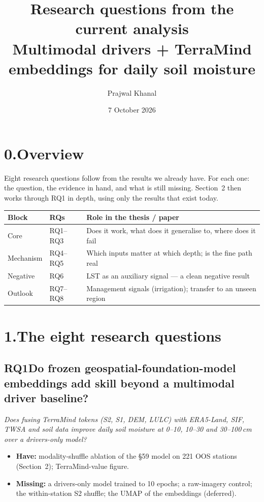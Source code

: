\documentclass[11pt,a4paper]{article}
\title{\textbf{Research questions from the current analysis}\\[3pt]
\large Multimodal drivers + TerraMind embeddings for daily soil moisture}
\author{Prajwal Khanal}
\date{7 October 2026}
\newcommand{\rqhead}[2]{\subsection*{#1\quad #2}}
\begin{document}
\maketitle

\section*{0.\quad Overview}

Eight research questions follow from the results we already have. For each one: the question,
the evidence in hand, and what is still missing. Section~2 then works through RQ1 in depth,
using only the results that exist today.

\begin{center}
\small
\begin{tabularx}{\linewidth}{@{}l l X@{}}
\toprule
Block & RQs & Role in the thesis / paper \\
\midrule
Core        & RQ1--RQ3 & Does it work, what does it generalise to, where does it fail \\
Mechanism   & RQ4--RQ5 & Which inputs matter at which depth; is the fine path real \\
Negative    & RQ6      & LST as an auxiliary signal --- a clean negative result \\
Outlook     & RQ7--RQ8 & Management signals (irrigation); transfer to an unseen region \\
\bottomrule
\end{tabularx}
\end{center}

\section*{1.\quad The eight research questions}

\rqhead{RQ1}{Do frozen geospatial-foundation-model embeddings add skill beyond a multimodal driver baseline?}
\textit{Does fusing TerraMind tokens (S2, S1, DEM, LULC) with ERA5-Land, SIF, TWSA and soil
data improve daily soil moisture at 0--10, 10--30 and 30--100\,cm over a drivers-only model?}
\begin{itemize}
\item \textbf{Have:} modality-shuffle ablation of the \S59 model on 221 OOS stations (Section~2);
      TerraMind-value figure.
\item \textbf{Missing:} a drivers-only model trained to 10 epochs; a raw-imagery control; the
      within-station S2 shuffle; the UMAP of the embeddings (deferred).
\end{itemize}
\end{document}
